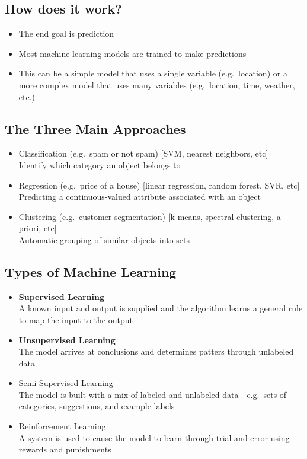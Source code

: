 \documentclass[12pt]{article}
\begin{document}
        \subsection{How does it work?}
            \begin{itemize}
                \item The end goal is prediction
                \item Most machine-learning models are trained to make predictions
                \item This can be a simple model that uses a single variable (e.g.\ location) or a more complex model that uses many variables (e.g.\ location, time, weather, etc.)
            \end{itemize}
        \subsection{The Three Main Approaches}
            \begin{itemize}
                \item Classification (e.g.\ spam or not spam) [SVM, nearest neighbors, etc]
                \\Identify which category an object belongs to
                \item Regression (e.g.\ price of a house) [linear regression, random forest, SVR, etc]
                \\Predicting a continuous-valued attribute associated with an object
                \item Clustering (e.g.\ customer segmentation) [k-means, spectral clustering, a-priori, etc]
                \\Automatic grouping of similar objects into sets
            \end{itemize}
        \subsection{Types of Machine Learning}
            \begin{itemize}
                \item \textbf{Supervised Learning}
                \\A known input and output is supplied and the algorithm learns a general rule to map the input to the output
                \item \textbf{Unsupervised Learning}
                \\The model arrives at conclusions and determines patters through unlabeled data
                \item Semi-Supervised Learning
                \\The model is built with a mix of labeled and unlabeled data - e.g.\ sets of categories, suggestions, and example labels
                \item Reinforcement Learning
                \\A system is used to cause the model to learn through trial and error using rewards and punishments
            \end{itemize}
\end{document}

